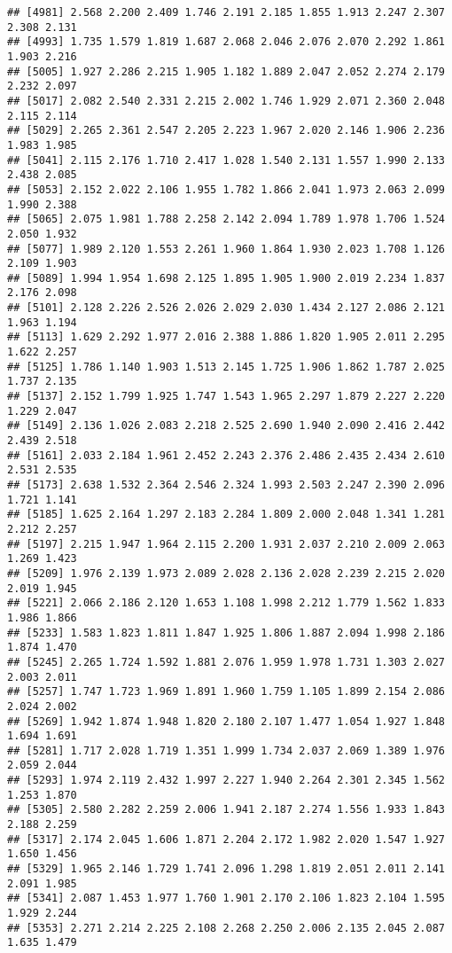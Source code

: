 \documentclass[
]{article}
\begin{document}
\begin{verbatim}
## [4981] 2.568 2.200 2.409 1.746 2.191 2.185 1.855 1.913 2.247 2.307 2.308 2.131
## [4993] 1.735 1.579 1.819 1.687 2.068 2.046 2.076 2.070 2.292 1.861 1.903 2.216
## [5005] 1.927 2.286 2.215 1.905 1.182 1.889 2.047 2.052 2.274 2.179 2.232 2.097
## [5017] 2.082 2.540 2.331 2.215 2.002 1.746 1.929 2.071 2.360 2.048 2.115 2.114
## [5029] 2.265 2.361 2.547 2.205 2.223 1.967 2.020 2.146 1.906 2.236 1.983 1.985
## [5041] 2.115 2.176 1.710 2.417 1.028 1.540 2.131 1.557 1.990 2.133 2.438 2.085
## [5053] 2.152 2.022 2.106 1.955 1.782 1.866 2.041 1.973 2.063 2.099 1.990 2.388
## [5065] 2.075 1.981 1.788 2.258 2.142 2.094 1.789 1.978 1.706 1.524 2.050 1.932
## [5077] 1.989 2.120 1.553 2.261 1.960 1.864 1.930 2.023 1.708 1.126 2.109 1.903
## [5089] 1.994 1.954 1.698 2.125 1.895 1.905 1.900 2.019 2.234 1.837 2.176 2.098
## [5101] 2.128 2.226 2.526 2.026 2.029 2.030 1.434 2.127 2.086 2.121 1.963 1.194
## [5113] 1.629 2.292 1.977 2.016 2.388 1.886 1.820 1.905 2.011 2.295 1.622 2.257
## [5125] 1.786 1.140 1.903 1.513 2.145 1.725 1.906 1.862 1.787 2.025 1.737 2.135
## [5137] 2.152 1.799 1.925 1.747 1.543 1.965 2.297 1.879 2.227 2.220 1.229 2.047
## [5149] 2.136 1.026 2.083 2.218 2.525 2.690 1.940 2.090 2.416 2.442 2.439 2.518
## [5161] 2.033 2.184 1.961 2.452 2.243 2.376 2.486 2.435 2.434 2.610 2.531 2.535
## [5173] 2.638 1.532 2.364 2.546 2.324 1.993 2.503 2.247 2.390 2.096 1.721 1.141
## [5185] 1.625 2.164 1.297 2.183 2.284 1.809 2.000 2.048 1.341 1.281 2.212 2.257
## [5197] 2.215 1.947 1.964 2.115 2.200 1.931 2.037 2.210 2.009 2.063 1.269 1.423
## [5209] 1.976 2.139 1.973 2.089 2.028 2.136 2.028 2.239 2.215 2.020 2.019 1.945
## [5221] 2.066 2.186 2.120 1.653 1.108 1.998 2.212 1.779 1.562 1.833 1.986 1.866
## [5233] 1.583 1.823 1.811 1.847 1.925 1.806 1.887 2.094 1.998 2.186 1.874 1.470
## [5245] 2.265 1.724 1.592 1.881 2.076 1.959 1.978 1.731 1.303 2.027 2.003 2.011
## [5257] 1.747 1.723 1.969 1.891 1.960 1.759 1.105 1.899 2.154 2.086 2.024 2.002
## [5269] 1.942 1.874 1.948 1.820 2.180 2.107 1.477 1.054 1.927 1.848 1.694 1.691
## [5281] 1.717 2.028 1.719 1.351 1.999 1.734 2.037 2.069 1.389 1.976 2.059 2.044
## [5293] 1.974 2.119 2.432 1.997 2.227 1.940 2.264 2.301 2.345 1.562 1.253 1.870
## [5305] 2.580 2.282 2.259 2.006 1.941 2.187 2.274 1.556 1.933 1.843 2.188 2.259
## [5317] 2.174 2.045 1.606 1.871 2.204 2.172 1.982 2.020 1.547 1.927 1.650 1.456
## [5329] 1.965 2.146 1.729 1.741 2.096 1.298 1.819 2.051 2.011 2.141 2.091 1.985
## [5341] 2.087 1.453 1.977 1.760 1.901 2.170 2.106 1.823 2.104 1.595 1.929 2.244
## [5353] 2.271 2.214 2.225 2.108 2.268 2.250 2.006 2.135 2.045 2.087 1.635 1.479

\end{verbatim}
\end{document}
